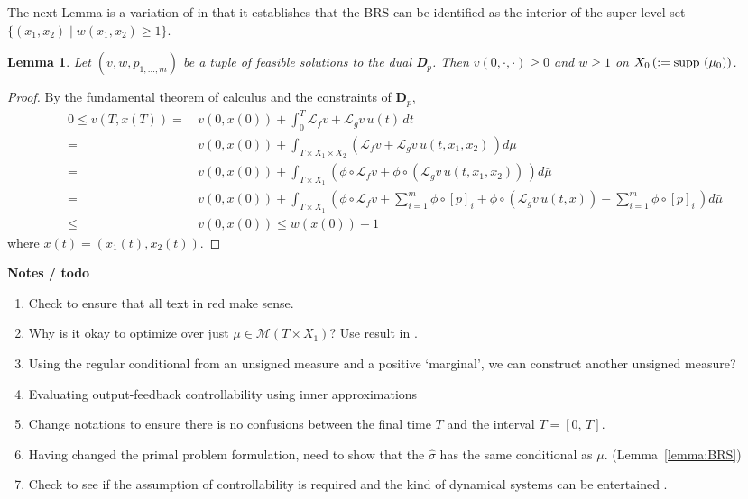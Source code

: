 \documentclass[dvipsnames]{article}
\newtheorem{lemma}{Lemma}
\providecommand{\supp}{\ensuremath \text{supp }}
\begin{document}
\justify
The next Lemma is a variation of \cite[Lemma 2]{Henrion} in that it establishes that the BRS can be identified as the interior of the super-level set $\{(x_1,x_2)\mid w(x_1,x_2)\ge 1\}$.

\begin{lemma}
Let $(v,w,p_{1,\ldots,m})$ be a tuple of feasible solutions to the dual {\bf D$_p$}. Then $v(0,\cdot,\cdot)\ge 0$ and $w\ge 1$ on $X_0\,(:=\supp (\mu_0))$.
\end{lemma}
\begin{proof}
    By the fundamental theorem of calculus and the constraints of {\bf D$_p$},
    \begin{align*}
      0\le v(T,x(T))=&\,v(0,x(0))+\int_{0}^T \mathcal L_fv+\mathcal L_gv\,u(t)\, dt\\
      =&\,v(0,x(0))+\int_{T\times X_1\times X_2} \left(\mathcal L_fv+\mathcal L_gv\,u(t,x_1,x_2)\, \right)d\mu\\
      =&\,v(0,x(0))+\int_{T\times X_1} \left(\phi\circ\mathcal L_fv+\phi \circ (\mathcal L_gv\,u(t,x_1,x_2))\,\right) d\bar\mu\\
      =&\,v(0,x(0))+\int_{T\times X_1} \left(\phi\circ\mathcal L_fv+\sum_{i=1}^m\phi\circ [p]_i+\phi \circ (\mathcal L_gv\,u(t,x))-\sum_{i=1}^m\phi\circ [p]_i\, \right)d\bar\mu\\
      \le&\,v(0,x(0))\le w(x(0))-1
    \end{align*}
    where $x(t)=(x_1(t),x_2(t))$.
\end{proof}
\begin{mybox_red}
{\bf Notes / todo}
\begin{enumerate}
    \item Check to ensure that all text in red make sense.
    \item Why is it okay to optimize over just $\bar\mu\in \mathcal M(T\times X_1)$? Use result in \cite[Theorem 10.7.2]{bogachev_v2}.
    \item Using the regular conditional from an unsigned measure and a positive `marginal', we can construct another unsigned measure?
    \item Evaluating output-feedback controllability using inner approximations
    \item Change notations to ensure there is no confusions between the final time $T$ and the interval $T=[0,\,T]$.
    \item Having changed the primal problem formulation, need to show that the $\hat\sigma$ has the same conditional as $\mu$. (Lemma~\ref{lemma:BRS})
    \item Check to see if the assumption of controllability is required and the kind of dynamical systems can be entertained \cite[Assumption 2]{Henrion}.
\end{enumerate}
\end{mybox_red}
\end{document}
